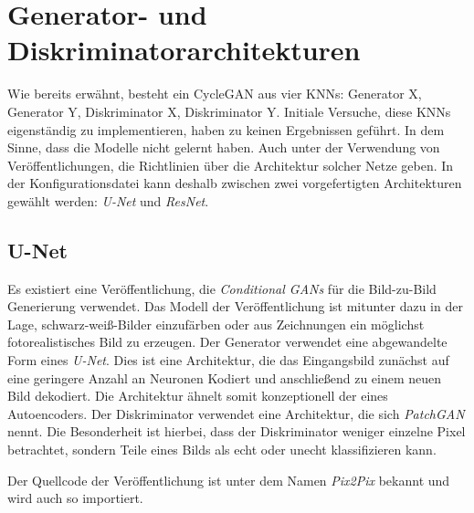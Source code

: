 \section{Generator- und Diskriminatorarchitekturen}
Wie bereits erwähnt, besteht ein \ac{CycleGAN} aus vier \acp{KNN}: Generator X, Generator Y, Diskriminator X, Diskriminator Y. Initiale Versuche, diese \acp{KNN} eigenständig zu implementieren, haben zu keinen Ergebnissen geführt. In dem Sinne, dass die Modelle nicht gelernt haben. Auch unter der Verwendung von Veröffentlichungen, die Richtlinien über die Architektur solcher Netze geben. In der Konfigurationsdatei kann deshalb zwischen zwei vorgefertigten Architekturen gewählt werden: \emph{U-Net} und \emph{ResNet}.

\subsection{U-Net}
Es existiert eine Veröffentlichung, die \emph{Conditional \acp{GAN}} für die Bild-zu-Bild Generierung verwendet. Das Modell der Veröffentlichung ist mitunter dazu in der Lage, schwarz-weiß-Bilder einzufärben oder aus Zeichnungen ein möglichst fotorealistisches Bild zu erzeugen. Der Generator verwendet eine abgewandelte Form eines \emph{U-Net}. Dies ist eine Architektur, die das Eingangsbild zunächst auf eine geringere Anzahl an Neuronen Kodiert und anschließend zu einem neuen Bild dekodiert. Die Architektur ähnelt somit konzeptionell der eines Autoencoders. Der Diskriminator verwendet eine Architektur, die sich \emph{PatchGAN} nennt. Die Besonderheit ist hierbei, dass der Diskriminator weniger einzelne Pixel betrachtet, sondern Teile eines Bilds als echt oder unecht klassifizieren kann.

Der Quellcode der Veröffentlichung ist unter dem Namen \emph{Pix2Pix} bekannt und wird auch so importiert. 